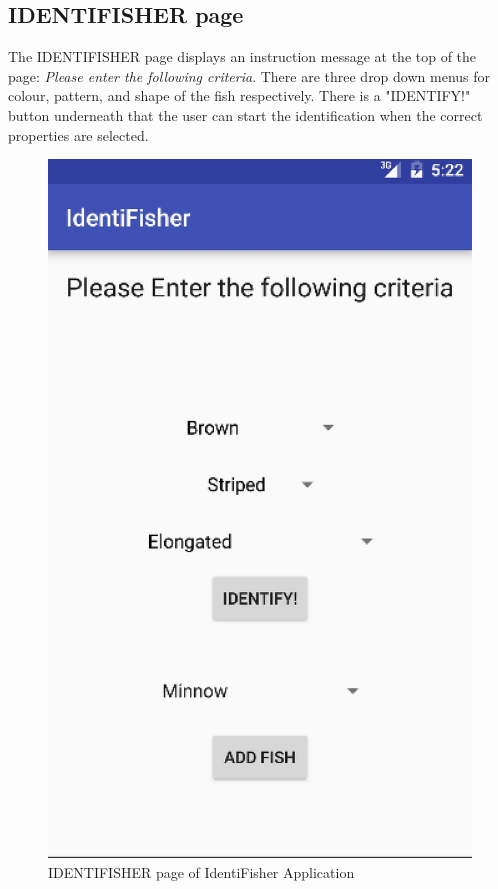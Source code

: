 \documentclass{article}
\begin{document}
\subsection{IDENTIFISHER page}
The IDENTIFISHER page displays an instruction message at the top of the page: \textit{Please enter the following criteria}. There are three
drop down menus for colour, pattern, and shape of the fish respectively. There is a "IDENTIFY!" button underneath that the user can
start the identification when the correct properties are selected.\\

\begin{figure}[H]
	\includegraphics[scale=0.30]{IdentiFisher.png}
	\caption{IDENTIFISHER page of IdentiFisher Application}
\end{figure}
\end{document}
